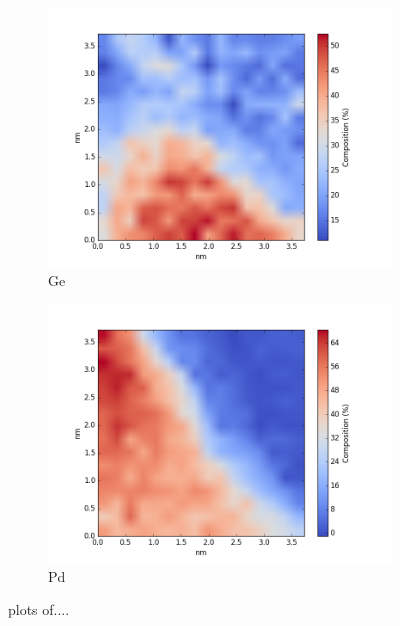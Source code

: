 \begin{figure}
\begin{subfigure}{0.5\textwidth}
		\includegraphics[width=\textwidth]{fig/q/D_heated/_binned_Ge_zetaAbs}
		\caption{Ge}
		\label{fig:Dge}
	\end{subfigure}%
	\hfill
	\begin{subfigure}{0.5\textwidth}
		\includegraphics[width=\textwidth]{fig/q/D_heated/_binned_Pd_zetaAbs}
		\caption{Pd}
		\label{fig:Dpd}
	\end{subfigure}
	\caption{plots of....}
	\label{fig:D}
\end{figure}

